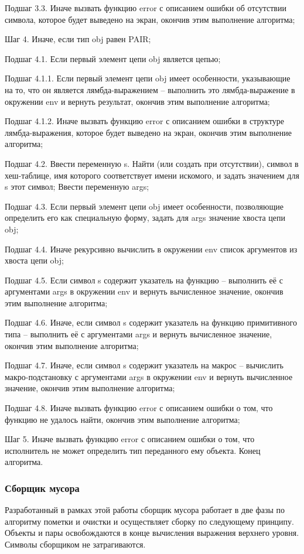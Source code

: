 Подшаг 3.3. Иначе вызвать функцию error с описанием ошибки об отсутствии символа, которое будет выведено на экран, окончив этим выполнение алгоритма;

Шаг 4. Иначе, если тип obj равен PAIR;

Подшаг 4.1. Если первый элемент цепи obj является цепью;

Подшаг 4.1.1. Если первый элемент цепи obj имеет особенности, указывающие на то, что он является лямбда-выражением -- выполнить это лямбда-выражение в окружении env и вернуть результат, окончив этим выполнение алгоритма;

Подшаг 4.1.2. Иначе вызвать функцию error с описанием ошибки в структуре лямбда-выражения, которое будет выведено на экран, окончив этим выполнение алгоритма;

Подшаг 4.2. Ввести переменную s. Найти (или создать при отсутствии), символ в хеш-таблице, имя которого соответствует имени искомого, и задать значением для s этот символ; Ввести переменную args;

Подшаг 4.3. Если первый элемент цепи obj имеет особенности, позволяющие определить его как специальную форму, задать для args значение хвоста цепи obj;

Подшаг 4.4. Иначе рекурсивно вычислить в окружении env список аргументов из хвоста цепи obj;

Подшаг 4.5. Если символ s содержит указатель на функцию -- выполнить её с аргументами args в окружении env и вернуть вычисленное значение, окончив этим выполнение алгоритма;

Подшаг 4.6. Иначе, если символ s содержит указатель на функцию примитивного типа -- выполнить её с аргументами args и вернуть вычисленное значение, окончив этим выполнение алгоритма;

Подшаг 4.7. Иначе, если символ s содержит указатель на макрос -- вычислить макро-подстановку с аргументами args в окружении env и вернуть вычисленное значение, окончив этим выполнение алгоритма;

Подшаг 4.8. Иначе вызвать функцию error с описанием ошибки о том, что функцию не удалось найти, окончив этим выполнение алгоритма;

Шаг 5. Иначе вызвать функцию error с описанием ошибки о том, что исполнитель не может определить тип переданного ему объекта. Конец алгоритма.

\subsubsection{Сборщик мусора}
Разработанный в рамках этой работы сборщик мусора работает в две фазы по алгоритму пометки и очистки и осуществляет сборку по следующему принципу.
Объекты и пары освобождаются в конце вычисления выражения верхнего уровня. Символы сборщиком не затрагиваются.

